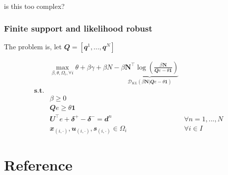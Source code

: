 \documentclass[
  a4paper,
,tablecaptionabove
]{scrartcl}
\numberwithin{equation}{section}
\begin{document}
is this too complex?

\hypertarget{finite-support-and-likelihood-robust}{%
  \subsubsection{Finite support and likelihood
    robust}\label{finite-support-and-likelihood-robust}}

The problem is, let
\(\mathbfit Q = [\mathbfit{q}^1, ..., \mathbfit{q}^N]\)

\[\begin{aligned}
     & \max_{\beta, \theta, \Omega_i, \forall i} \theta + \beta \gamma +  \beta N - \underbrace{\beta \mathbf N^\top \log(\frac{\beta \mathbf N}{\mathbfit{Q} e-\theta \mathbf 1})}_{\mathcal D_{KL}(\beta \mathbf N | \mathbfit{Q} e-\theta \mathbf 1)}                         \\
    \textbf {s.t.}                                                                                                                                                                                                                                                               \\
     & \beta \ge 0                                                                                                                                                                                                                                                               \\
     & \mathbfit{Q} e \ge \theta \mathbf 1                                                                                                                                                                                                                                       \\
     & \mathbfit{U} ^\top e + \mathbfit \delta^+ - \mathbfit \delta^-  = \mathbfit d^n                                                                                                                                                                   & \forall n = 1, ..., N \\
     & \mathbfit x_{(i,\cdot)}, \mathbfit u_{(i,\cdot)}, \mathbfit s_{(i,\cdot)} \in \Omega_i                                                                                                                                                            & \forall i\in I
  \end{aligned}\]

\hypertarget{reference}{%
  \section*{Reference}\label{reference}}
\end{document}
